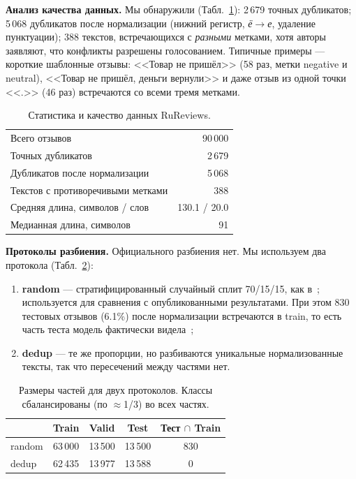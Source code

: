 \documentclass{article}
\begin{document}
\textbf{Анализ качества данных.} Мы обнаружили (Табл.~\ref{tab:quality}): 2\,679 точных дубликатов; 5\,068 дубликатов после нормализации (нижний регистр, \textit{ё}$\to$\textit{е}, удаление пунктуации); 388 текстов, встречающихся с \emph{разными} метками, хотя авторы заявляют, что конфликты разрешены голосованием. Типичные примеры --- короткие шаблонные отзывы: <<Товар не пришёл>> (58 раз, метки negative и neutral), <<Товар не пришёл, деньги вернули>> и даже отзыв из одной точки <<.>> (46 раз) встречаются со всеми тремя метками.

\begin{table}[tbh!]
\begin{center}
\begin{tabular}{|l|r|}
\hline
Всего отзывов & 90\,000 \\
Точных дубликатов & 2\,679 \\
Дубликатов после нормализации & 5\,068 \\
Текстов с противоречивыми метками & 388 \\
Средняя длина, символов / слов & 130.1 / 20.0 \\
Медианная длина, символов & 91 \\
\hline
\end{tabular}
\caption{Статистика и качество данных RuReviews.}
\label{tab:quality}
\end{center}
\end{table}

\textbf{Протоколы разбиения.} Официального разбиения нет. Мы используем два протокола (Табл.~\ref{tab:splits}):
\begin{enumerate}
    \item \textbf{random} --- стратифицированный случайный сплит 70/15/15, как в~\cite{smetanin2021deep}; используется для сравнения с опубликованными результатами. При этом 830 тестовых отзывов (6.1\%) после нормализации встречаются в train, то есть часть теста модель фактически видела~\cite{elangovan2021memorization};
    \item \textbf{dedup} --- те же пропорции, но разбиваются уникальные нормализованные тексты, так что пересечений между частями нет.
\end{enumerate}

\begin{table}[tbh!]
\begin{center}
\begin{tabular}[t]{|l|ccc|c|}
\hline
 & Train & Valid & Test & Тест $\cap$ Train \\
\hline
random & 63\,000 & 13\,500 & 13\,500 & 830 \\
dedup & 62\,435 & 13\,977 & 13\,588 & 0 \\
\hline
\end{tabular}
\caption{Размеры частей для двух протоколов. Классы сбалансированы (по $\approx$1/3) во всех частях.}
\label{tab:splits}
\end{center}
\end{table}
\end{document}
